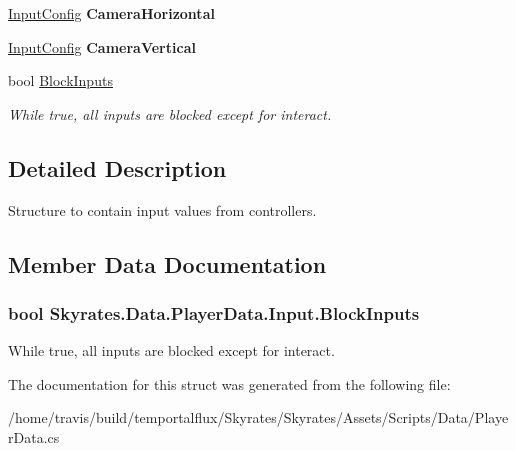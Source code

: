 \begin{DoxyCompactItemize}
\item 
\hypertarget{struct_skyrates_1_1_data_1_1_player_data_1_1_input_ada55ddfe4b06f71afb84dbae481c4347}{\hyperlink{class_skyrates_1_1_data_1_1_player_data_1_1_input_config}{Input\-Config} {\bfseries Camera\-Horizontal}}\label{struct_skyrates_1_1_data_1_1_player_data_1_1_input_ada55ddfe4b06f71afb84dbae481c4347}

\item 
\hypertarget{struct_skyrates_1_1_data_1_1_player_data_1_1_input_a402017612cb89da0555e8423fe834424}{\hyperlink{class_skyrates_1_1_data_1_1_player_data_1_1_input_config}{Input\-Config} {\bfseries Camera\-Vertical}}\label{struct_skyrates_1_1_data_1_1_player_data_1_1_input_a402017612cb89da0555e8423fe834424}

\item 
bool \hyperlink{struct_skyrates_1_1_data_1_1_player_data_1_1_input_a2bdc93fb39026f0e848d02f5e4a7880c}{Block\-Inputs}
\begin{DoxyCompactList}\small\item\em While true, all inputs are blocked except for interact. \end{DoxyCompactList}\end{DoxyCompactItemize}


\subsection{Detailed Description}
Structure to contain input values from controllers. 



\subsection{Member Data Documentation}
\hypertarget{struct_skyrates_1_1_data_1_1_player_data_1_1_input_a2bdc93fb39026f0e848d02f5e4a7880c}{
\subsubsection[{Block\-Inputs}]{\setlength{\rightskip}{0pt plus 5cm}bool Skyrates.\-Data.\-Player\-Data.\-Input.\-Block\-Inputs}}\label{struct_skyrates_1_1_data_1_1_player_data_1_1_input_a2bdc93fb39026f0e848d02f5e4a7880c}


While true, all inputs are blocked except for interact. 



The documentation for this struct was generated from the following file\-:\begin{DoxyCompactItemize}
\item 
/home/travis/build/temportalflux/\-Skyrates/\-Skyrates/\-Assets/\-Scripts/\-Data/Player\-Data.\-cs\end{DoxyCompactItemize}
